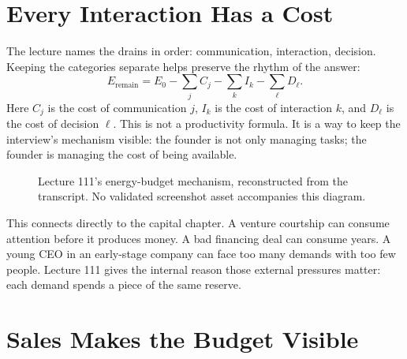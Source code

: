 \documentclass[11pt,oneside]{book}
\begin{document}
\section{Every Interaction Has a Cost}

The lecture names the drains in order: communication, interaction, decision. Keeping the categories separate helps preserve the rhythm of the answer:
\[
E_{\mathrm{remain}}
=
E_0
-
\sum_j C_j
-
\sum_k I_k
-
\sum_{\ell} D_{\ell}.
\]
Here \(C_j\) is the cost of communication \(j\), \(I_k\) is the cost of interaction \(k\), and \(D_{\ell}\) is the cost of decision \(\ell\). This is not a productivity formula. It is a way to keep the interview's mechanism visible: the founder is not only managing tasks; the founder is managing the cost of being available.

\begin{figure}
\centering
{}
\caption{Lecture 111's energy-budget mechanism, reconstructed from the transcript. No validated screenshot asset accompanies this diagram.}
\end{figure}

This connects directly to the capital chapter. A venture courtship can consume attention before it produces money. A bad financing deal can consume years. A young CEO in an early-stage company can face too many demands with too few people. Lecture 111 gives the internal reason those external pressures matter: each demand spends a piece of the same reserve.

\section{Sales Makes the Budget Visible}
\end{document}
